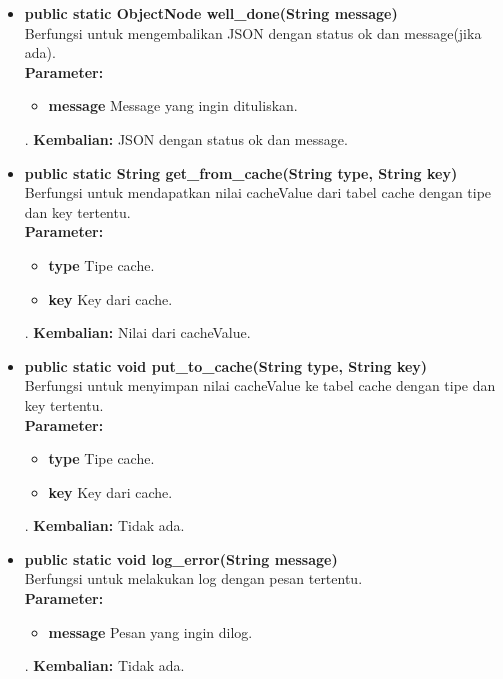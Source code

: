 \begin{enumerate}
\begin{itemize}
		\item \textbf{public static ObjectNode well\_done(String message)}\\
		Berfungsi untuk mengembalikan JSON dengan status ok dan message(jika ada).\\
		\textbf{Parameter:}
				\begin{itemize}
					\item \textbf{message} Message yang ingin dituliskan.
				\end{itemize}.
		\textbf{Kembalian:}  JSON dengan status ok dan message.
		
		\item \textbf{public static String get\_from\_cache(String type, String key)}\\
		Berfungsi untuk mendapatkan nilai cacheValue dari tabel cache dengan tipe dan key tertentu.\\
		\textbf{Parameter:}
				\begin{itemize}
					\item \textbf{type} Tipe cache.
					\item \textbf{key} Key dari cache.
				\end{itemize}.
		\textbf{Kembalian:}  Nilai dari cacheValue.
	
		\item \textbf{public static void put\_to\_cache(String type, String key)}\\
		Berfungsi untuk menyimpan nilai cacheValue ke tabel cache dengan tipe dan key tertentu.\\
		\textbf{Parameter:}
				\begin{itemize}
					\item \textbf{type} Tipe cache.
					\item \textbf{key} Key dari cache.
				\end{itemize}.
		\textbf{Kembalian:}  Tidak ada.
	
	
		\item \textbf{public static void log\_error(String message)}\\
		Berfungsi untuk melakukan log dengan pesan tertentu.\\
		\textbf{Parameter:}
				\begin{itemize}
					\item \textbf{message} Pesan yang ingin dilog.
				\end{itemize}.
		\textbf{Kembalian:}  Tidak ada.
		

\end{itemize}
\end{enumerate}
